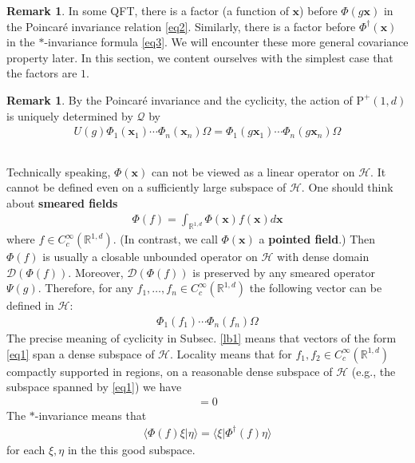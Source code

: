 \documentclass[12pt,b5paper,notitlepage]{article}
\theoremstyle{definition}
\newtheorem{rem}[df]{Remark}
\theoremstyle{plain}
\newcommand{\mc}{\mathcal}
\newcommand{\Dom}{\scr{D}}
\newcommand{\bk}[1]{\langle {#1}\rangle}
\newcommand{\scr}{\mathscr}
\newcommand{\Rbb}{\mathbb R}
\newcommand{\Poid}{{\mathrm P}^+(1,d)}
\newcommand{\xbf}{\mathbf x}
\numberwithin{equation}{section}
\begin{document}
\begin{rem}
In some QFT, there is a factor (a function of $\xbf$) before $\Phi(g\xbf)$ in the Poincar\'e invariance relation \eqref{eq2}. Similarly, there is a factor before $\Phi^\dagger(\xbf)$ in the $*$-invariance formula \eqref{eq3}. We will encounter these more general covariance property later. In this section, we content ourselves with the simplest case that the factors are $1$.
\end{rem}

\begin{rem}\label{lb7}
By the Poincar\'e invariance and the cyclicity, the action of $\Poid$ is uniquely determined by $\scr Q$ by
\begin{align}
U(g)\Phi_1(\xbf_1)\cdots\Phi_n(\xbf_n)\Omega=\Phi_1(g\xbf_1)\cdots\Phi_n(g\xbf_n)\Omega
\end{align}
\end{rem}


\subsection{}

Technically speaking, $\Phi(\xbf)$ can not be viewed as a linear operator on $\mc H$. It  cannot be defined even on a sufficiently large subspace of $\mc H$. One should think about \textbf{smeared fields} 
\begin{align}
\Phi(f)=\int_{\Rbb^{1,d}}\Phi(\xbf)f(\xbf)d\xbf
\end{align}
where $f\in C_c^\infty(\Rbb^{1,d})$. (In contrast, we call $\Phi(\xbf)$ a \textbf{pointed field}.) Then $\Phi(f)$ is usually a closable unbounded operator on $\mc H$ with dense domain $\Dom(\Phi(f))$. Moreover, $\Dom(\Phi(f))$ is preserved by any smeared operator $\Psi(g)$. Therefore, for any $f_1,\dots,f_n\in C_c^\infty(\Rbb^{1,d})$ the following vector can be defined in $\mc H$:
\begin{align}\label{eq1}
\Phi_1(f_1)\cdots\Phi_n(f_n)\Omega
\end{align}
The precise meaning of cyclicity in Subsec. \ref{lb1} means that vectors of the form \eqref{eq1} span a dense subspace of $\mc H$. Locality means that for $f_1,f_2\in C_c^\infty(\Rbb^{1,d})$ compactly supported in  regions, on a reasonable dense subspace of $\mc H$ (e.g., the subspace spanned by \eqref{eq1}) we have
\begin{align}
[\Phi_1(f_1),\Phi_2(f_2)]=0
\end{align}
The $*$-invariance means that
\begin{align}
\bk{\Phi(f)\xi|\eta}=\bk{\xi|\Phi^\dagger(f)\eta}
\end{align}
for each $\xi,\eta$ in the this good subspace. 
\end{document}
